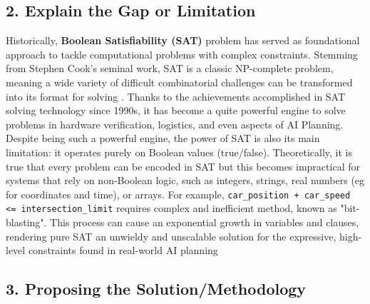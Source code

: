 \documentclass[12pt, a4paper, oneside]{report} %
\begin{document}
\subsection*{2. Explain the Gap or Limitation}
Historically,  \textbf{Boolean Satisfiability (SAT)} problem has served as foundational approach to tackle computational problems with complex constraints. Stemming from Stephen Cook's seminal work, SAT is a classic NP-complete problem, meaning a wide variety of difficult combinatorial challenges can be transformed into its format for solving \cite{Cook1971}. Thanks to the achievements accomplished in SAT solving technology since 1990s, it has become a quite powerful engine to solve problems in hardware verification, logistics, and even aspects of AI Planning. Despite being such a powerful engine, the power of SAT is also its main limitation: it operates purely on Boolean values (true/false). Theoretically, it is true that every problem can be encoded in SAT but this becomes impractical for systems that rely on non-Boolean logic, such as integers, strings, real numbers (eg for coordinates and time), or arrays. For example, \texttt{car\_position + car\_speed <= intersection\_limit} requires complex and inefficient method, known as "bit-blasting". This process can cause an exponential growth in variables and clauses, rendering pure SAT an unwieldy and unscalable  solution for the expressive, high-level constraints found in real-world AI planning \cite{demoura2011smt}


\subsection*{3. Proposing the Solution/Methodology}
\end{document}
